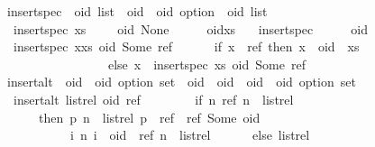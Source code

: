 \begin{isabelle}
\isamarkupfalse%
\ insert{\isacharunderscore}spec\ {\isacharcolon}{\isacharcolon}\ {\isachardoublequoteopen}{\isacharprime}oid\ list\ {\isasymRightarrow}\ {\isacharparenleft}{\isacharprime}oid\ {\isasymtimes}\ {\isacharprime}oid\ option{\isacharparenright}\ {\isasymRightarrow}\ {\isacharprime}oid\ list{\isachardoublequoteclose}\ \isanewline
\ \ {\isachardoublequoteopen}insert{\isacharunderscore}spec\ xs\ \ \ \ \ {\isacharparenleft}oid{\isacharcomma}\ None{\isacharparenright}\ \ \ \ \ {\isacharequal}\ oid{\isacharhash}xs{\isachardoublequoteclose}\ {\isacharbar}\isanewline
\ \ {\isachardoublequoteopen}insert{\isacharunderscore}spec\ {\isacharbrackleft}{\isacharbrackright}\ \ \ \ \ {\isacharparenleft}oid{\isacharcomma}\ {\isacharunderscore}{\isacharparenright}\ \ \ \ \ \ \ \ {\isacharequal}\ {\isacharbrackleft}{\isacharbrackright}{\isachardoublequoteclose}\ {\isacharbar}\isanewline
\ \ {\isachardoublequoteopen}insert{\isacharunderscore}spec\ {\isacharparenleft}x{\isacharhash}xs{\isacharparenright}\ {\isacharparenleft}oid{\isacharcomma}\ Some\ ref{\isacharparenright}\ {\isacharequal}\isanewline
\ \ \ \ \ {\isacharparenleft}if\ x\ {\isacharequal}\ ref\ then\ x\ {\isacharhash}\ oid\ {\isacharhash}\ xs\isanewline
\ \ \ \ \ \ \ \ \ \ \ \ \ \ \ \ \ else\ x\ {\isacharhash}\ {\isacharparenleft}insert{\isacharunderscore}spec\ xs\ {\isacharparenleft}oid{\isacharcomma}\ Some\ ref{\isacharparenright}{\isacharparenright}{\isacharparenright}{\isachardoublequoteclose}\isanewline
\isanewline
{}\isamarkupfalse%
\ insert{\isacharunderscore}alt\ {\isacharcolon}{\isacharcolon}\ {\isachardoublequoteopen}{\isacharparenleft}{\isacharprime}oid\ {\isasymtimes}\ {\isacharprime}oid\ option{\isacharparenright}\ set\ {\isasymRightarrow}\ {\isacharparenleft}{\isacharprime}oid\ {\isasymtimes}\ {\isacharprime}oid{\isacharparenright}\ {\isasymRightarrow}\ {\isacharparenleft}{\isacharprime}oid\ {\isasymtimes}\ {\isacharprime}oid\ option{\isacharparenright}\ set{\isachardoublequoteclose}\ \isanewline
\ \ {\isachardoublequoteopen}insert{\isacharunderscore}alt\ list{\isacharunderscore}rel\ {\isacharparenleft}oid{\isacharcomma}\ ref{\isacharparenright}\ {\isacharequal}\ {\isacharparenleft}\isanewline
\ \ \ \ \ \ if\ {\isasymexists}n{\isachardot}\ {\isacharparenleft}ref{\isacharcomma}\ n{\isacharparenright}\ {\isasymin}\ list{\isacharunderscore}rel\isanewline
\ \ \ \ \ \ then\ {\isacharbraceleft}{\isacharparenleft}p{\isacharcomma}\ n{\isacharparenright}\ {\isasymin}\ list{\isacharunderscore}rel{\isachardot}\ p\ {\isasymnoteq}\ ref{\isacharbraceright}\ {\isasymunion}\ {\isacharbraceleft}{\isacharparenleft}ref{\isacharcomma}\ Some\ oid{\isacharparenright}{\isacharbraceright}\ {\isasymunion}\isanewline
\ \ \ \ \ \ \ \ \ \ \ {\isacharbraceleft}{\isacharparenleft}i{\isacharcomma}\ n{\isacharparenright}{\isachardot}\ i\ {\isacharequal}\ oid\ {\isasymand}\ {\isacharparenleft}ref{\isacharcomma}\ n{\isacharparenright}\ {\isasymin}\ list{\isacharunderscore}rel{\isacharbraceright}\isanewline
\ \ \ \ \ \ else\ list{\isacharunderscore}rel{\isacharparenright}{\isachardoublequoteclose}%
\end{isabelle}

